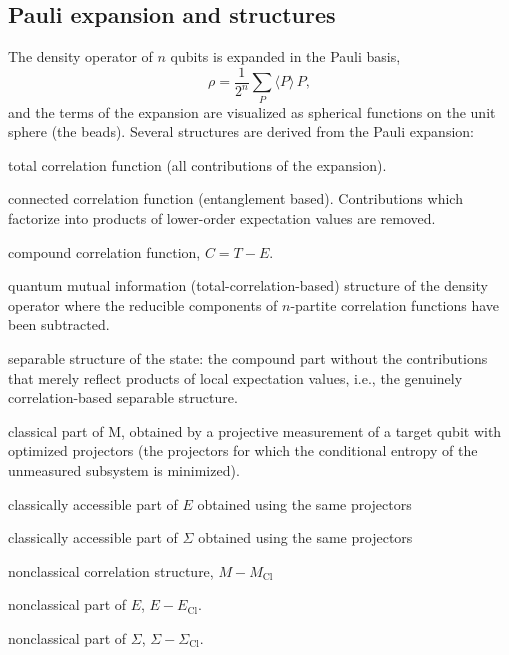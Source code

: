 \documentclass[11pt,a4paper]{article}
\begin{document}
\subsection{Pauli expansion and structures}
The density operator of $n$ qubits is expanded in the Pauli basis,
\[
  \rho = \frac{1}{2^n}\sum_{P}\langle P\rangle\,P ,
\]
and the terms of the expansion are visualized as spherical functions on the
unit sphere (the beads). Several structures are derived from the Pauli
expansion:
\begin{description}[leftmargin=2.2cm,style=nextline]
  \item[T] total correlation function (all contributions of the expansion).
  \item[E] connected correlation function (entanglement based). Contributions
        which factorize into products of lower-order expectation values are
        removed.
  \item[C] compound correlation function, $C = T - E$.
   \item[M] quantum mutual information (total-correlation-based) structure of the density operator
        where the reducible components of $n$-partite correlation functions
        have been subtracted.
  \item[$\Sigma$ (Sigma)] separable structure of the state: the compound part
        without the contributions that merely reflect products of local
        expectation values, i.e., the genuinely correlation-based separable
        structure.
        
 \item[\texorpdfstring{$M_{\mathrm{Cl}}$}{M\_Cl}] classical part of M,
        obtained by a projective measurement of a target qubit
        with optimized projectors (the projectors for which the conditional entropy of the unmeasured subsystem is minimized).
        
   \item[\texorpdfstring{$E_{\mathrm{Cl}}$}{Sigma\_Cl}] classically accessible part
        of $E$ obtained using the same projectors
    
  \item[\texorpdfstring{$\Sigma_{\mathrm{Cl}}$}{Sigma\_Cl}] classically accessible part
        of $\Sigma$ obtained using the same projectors
        
    \item[D] nonclassical correlation structure, $M - M_{\mathrm{Cl}}$ 
     \item[\texorpdfstring{$E_{\mathrm{D}}$}{E\_D}] nonclassical part
        of $E$, $E - E_{\mathrm{Cl}}$.     
  \item[\texorpdfstring{$\Sigma_{\mathrm{D}}$}{Sigma\_D}] nonclassical part
        of $\Sigma$, $\Sigma - \Sigma_{\mathrm{Cl}}$.
  
\end{description}
\end{document}
